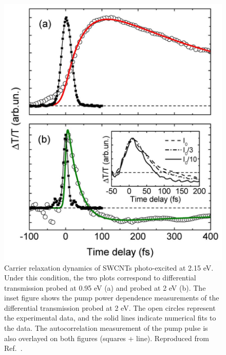 \begin{figure}[H]
	\centering
	\includegraphics[scale=0.25]{images/chapter_prior_works/e22_pump_probe_manzoni}
	\caption{Carrier relaxation dynamics of SWCNTs photo-excited at 2.15 eV. Under this condition, the two plots correspond to differential transmission probed at 0.95 eV (a) and probed at 2 eV (b). The inset figure shows the pump power dependence measurements of the differential transmission probed at 2 eV. The open circles represent the experimental data, and the solid lines indicate numerical fits to the data. The autocorrelation measurement of the pump pulse is also overlayed on both figures (squares + line). Reproduced from Ref.\ \cite{manzoni2005intersubband}.}
	\label{fig:e22_pump_manzoni}
\end{figure}

